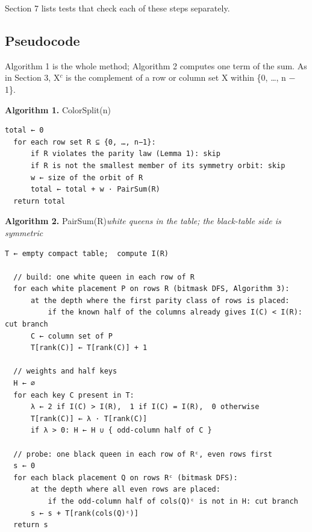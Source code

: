 Section 7 lists tests that check each of these steps separately.

\subsection*{Pseudocode}

Algorithm 1 is the whole method; Algorithm 2 computes one term of the sum. As in Section 3, X$^{c}$ is the complement of a row or column set X within \{0, …, n − 1\}.

\begin{algobox}
\noindent\textbf{Algorithm 1.} ColorSplit(n)\par\smallskip
\begin{Verbatim}[fontsize=\small]
  total ← 0
  for each row set R ⊆ {0, …, n−1}:
      if R violates the parity law (Lemma 1): skip
      if R is not the smallest member of its symmetry orbit: skip
      w ← size of the orbit of R
      total ← total + w · PairSum(R)
  return total
\end{Verbatim}
\end{algobox}

\begin{algobox}
\noindent\textbf{Algorithm 2.} PairSum(R)\hfill{\small\itshape white queens in the table; the black-table side is symmetric}\par\smallskip
\begin{Verbatim}[fontsize=\small]
  T ← empty compact table;  compute I(R)

  // build: one white queen in each row of R
  for each white placement P on rows R (bitmask DFS, Algorithm 3):
      at the depth where the first parity class of rows is placed:
          if the known half of the columns already gives I(C) < I(R): cut branch
      C ← column set of P
      T[rank(C)] ← T[rank(C)] + 1

  // weights and half keys
  H ← ∅
  for each key C present in T:
      λ ← 2 if I(C) > I(R),  1 if I(C) = I(R),  0 otherwise
      T[rank(C)] ← λ · T[rank(C)]
      if λ > 0: H ← H ∪ { odd-column half of C }

  // probe: one black queen in each row of Rᶜ, even rows first
  s ← 0
  for each black placement Q on rows Rᶜ (bitmask DFS):
      at the depth where all even rows are placed:
          if the odd-column half of cols(Q)ᶜ is not in H: cut branch
      s ← s + T[rank(cols(Q)ᶜ)]
  return s
\end{Verbatim}
\end{algobox}

